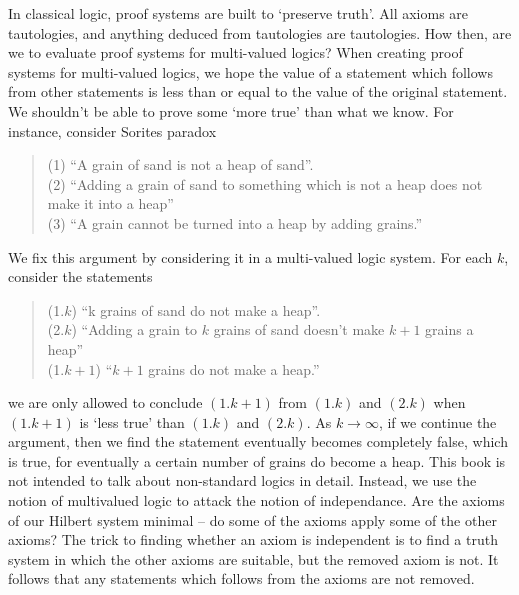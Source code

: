 In classical logic, proof systems are built to `preserve truth'. All axioms are tautologies, and anything deduced from tautologies are tautologies. How then, are we to evaluate proof systems for multi-valued logics? When creating proof systems for multi-valued logics, we hope the value of a statement which follows from other statements is less than or equal to the value of the original statement. We shouldn't be able to prove some `more true' than what we know. For instance, consider Sorites paradox
%
\begin{quote}
    (1) ``A grain of sand is not a heap of sand''.\\
    (2) ``Adding a grain of sand to something which is not a heap does not make it into a heap''\\
    (3) ``A grain cannot be turned into a heap by adding grains.''
\end{quote}
%
We fix this argument by considering it in a multi-valued logic system. For each $k$, consider the statements
%
\begin{quote}
    (1.$k$) ``k grains of sand do not make a heap''.\\
    (2.$k$) ``Adding a grain to $k$ grains of sand doesn't make $k+1$ grains a heap''\\
    (1.$k+1$) ``$k+1$ grains do not make a heap.''
\end{quote}
%
we are only allowed to conclude $(1.k+1)$ from $(1.k)$ and $(2.k)$ when $(1.k+1)$ is `less true' than $(1.k)$ and $(2.k)$. As $k \to \infty$, if we continue the argument, then we find the statement eventually becomes completely false, which is true, for eventually a certain number of grains do become a heap. This book is not intended to talk about non-standard logics in detail. Instead, we use the notion of multivalued logic to attack the notion of independance. Are the axioms of our Hilbert system minimal -- do some of the axioms apply some of the other axioms? The trick to finding whether an axiom is independent is to find a truth system in which the other axioms are suitable, but the removed axiom is not. It follows that any statements which follows from the axioms are not removed.

